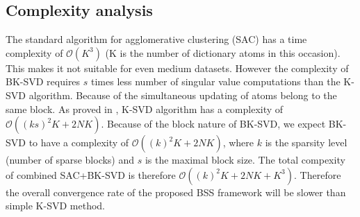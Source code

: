 \subsection{Complexity analysis}
The standard algorithm for agglomerative clustering (SAC) has a time complexity of ${\displaystyle {\mathcal {O}}(K^{3})}$ (K is the number of dictionary atoms in this occasion). This makes it not suitable for even medium datasets. However the complexity of BK-SVD requires $s$ times less number of singular value computations than the K-SVD algorithm. Because of the simultaneous updating of atoms belong to the same block.
As proved in \cite{OMP_KSVD}, K-SVD algorithm has a complexity of $\displaystyle {\mathcal {O}}((ks)^2K + 2NK)$. Because of the block nature of BK-SVD, we expect BK-SVD to have a complexity of $\displaystyle {\mathcal {O}}((k)^2K + 2NK)$, where $k$ is the sparsity level (number of sparse blocks) and $s$ is the maximal block size. The total compexity of combined SAC+BK-SVD is therefore $\displaystyle {\mathcal {O}}((k)^2K + 2NK+K^3)$. Therefore the overall convergence rate of the proposed BSS framework will be slower than simple K-SVD method.\\

